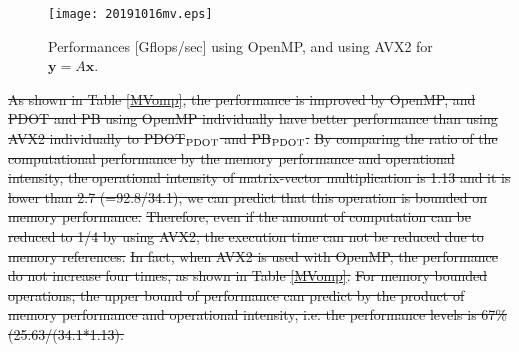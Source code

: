 \documentclass{IOS-Book-Article}
\begin{document}
\begin{figure}[htbp]
  \begin{center}
    \texttt{[image: 20191016mv.eps]}
        \caption{Performances [Gflops/sec] using OpenMP, and using AVX2 for $\bm{y} = A\bm{x}$.}
    \label{figMM}
  \end{center}
\end{figure}


\sout{As shown in Table \ref{MVomp}, the performance is improved by OpenMP, and PDOT and PB using OpenMP individually have better performance than using AVX2 individually to PDOT$_{\rm{PDOT}}$ and PB$_{\rm{PDOT}}$.}
\sout{By comparing the ratio of the computational performance by the memory performance and operational intensity, the operational intensity of matrix-vector multiplication is 1.13 and it is lower than 2.7 (=92.8/34.1), we can predict that this operation is bounded on memory performance.}
\sout{Therefore, even if the amount of computation can be reduced to 1/4 by using AVX2, the execution time can not be reduced due to memory references. }
\sout{In fact, when AVX2 is used with OpenMP, the performance do not increase four times, as shown in Table \ref{MVomp}.}
\sout{For memory bounded operations, the upper bound of performance can predict by the product of memory performance and operational intensity, i.e. the performance levels is 67\% (25.63/(34.1*1.13).}
\end{document}
